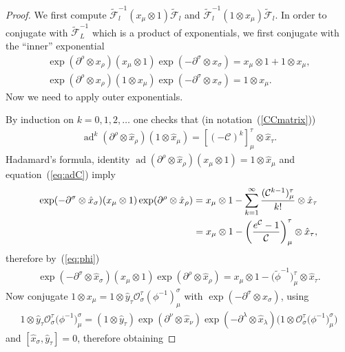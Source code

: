 \documentclass[10pt,a4paper]{amsart}
\def\CC{\mathcal{C}}
\def\OO{\mathcal{O}}
\def\hx{\hat{x}}
\def\hy{\hat{y}}
\def\ad{\operatorname{ad}}
\numberwithin{equation}{section}
\begin{document}
\begin{proof} We first compute $\tilde{\mathcal{F}}^{-1}_l(x_\mu\otimes 1)\tilde{\mathcal{F}}_l$ and $\tilde{\mathcal{F}}^{-1}_l(1\otimes x_\mu)\tilde{\mathcal{F}}_l$. In order to conjugate with $\tilde{\mathcal{F}}^{-1}_L$ which is a product of exponentials, we first conjugate with the ``inner'' exponential
\begin{gather}\label{eq:ex1e}
\exp(\partial^\rho\otimes x_\rho)(x_\mu\otimes 1)\exp(-\partial^\sigma\otimes x_\sigma) = x_\mu\otimes 1 + 1\otimes x_\mu,\\
\label{eq:e1xe}
\exp(\partial^\rho\otimes x_\rho)(1\otimes x_\mu)\exp(-\partial^\sigma\otimes x_\sigma) = 1\otimes x_\mu.
\end{gather}
Now we need to apply outer exponentials.

By induction on $k = 0,1,2,\ldots$ one checks that
(in notation~(\ref{CCmatrix}))
\begin{gather}\label{eq:adC}
\ad^k(\partial^\rho\otimes\hx_\rho) (1\otimes\hx_\mu) = [(-\CC)^k]^\tau_\mu\otimes\hx_\tau.
\end{gather}
Hadamard's formula, identity $\ad(\partial^\rho\otimes\hx_\rho)(x_\mu\otimes 1)=1\otimes\hx_\mu$ and equation~(\ref{eq:adC}) imply
\begin{gather*}
\exp(-\partial^\sigma\otimes\hx_\sigma)(x_\mu\otimes 1)\exp(\partial^\rho\otimes\hat{x}_\rho) = x_\mu\otimes 1 - \sum_{k=1}^\infty \frac{(\CC^{k-1})^\tau_\mu}{k!}\otimes\hx_\tau\\
\hphantom{\exp(-\partial^\sigma\otimes\hx_\sigma)(x_\mu\otimes 1)\exp(\partial^\rho\otimes\hat{x}_\rho) }{}
 = x_\mu\otimes 1 - \left(\frac{e^{\CC}-1}{\CC}\right)^\tau_\mu\otimes\hx_\tau,
\end{gather*}
therefore by~(\ref{eq:phi})
\begin{gather}\label{eq:eFe}
\exp(-\partial^\sigma\otimes\hx_\sigma)(x_\mu\otimes 1)\exp(\partial^\rho\otimes
\hat{x}_\rho) = x_\mu\otimes 1 - \big(\tilde\phi^{-1}\big)^\tau_\mu\otimes\hat{x}_\tau.
\end{gather}
Now conjugate $1\otimes x_\mu = 1\otimes\hy_\tau\OO^\tau_\sigma(\phi^{-1})^\sigma_\mu$ with $\exp(-\partial^\sigma\otimes\hx_\sigma)$, using
\begin{gather*}1\otimes\hy_\tau\OO^\tau_\sigma\big(\phi^{-1}\big)^\sigma_\mu = (1\otimes\hy_\tau)\exp(\partial^\nu\otimes\hx_\nu)\exp(-\partial^\lambda\otimes\hx_\lambda)\big(1\otimes\OO^\tau_\sigma \big(\phi^{-1}\big)^\sigma_\mu\big)\end{gather*}
and $[\hx_\sigma,\hy_\tau] = 0$, therefore obtaining

\end{proof}
\end{document}
